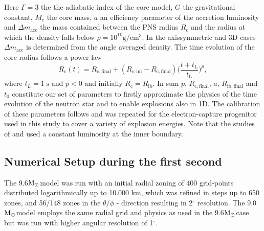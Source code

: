 \documentclass[fleqn,usenatbib]{mnras}
\newcommand{\solm}{\xspace\ensuremath{\rm{M_{\odot}}}}
\begin{document}
Here $\Gamma = 3$ the the adiabatic index of the core model, $G$ the gravitational constant, $M_{\mathrm{c}}$ the core mass, $a$ an efficiency parameter of the accretion luminosity and $\Delta m_{\mathrm{acc}}$ the mass contained between the PNS radius $R_\mathrm{c}$ and the radius at which the density falls below $\rho=10^{10}\mathrm{g/cm^3}$. 
In the axissymmetric and 3D cases $\Delta m_{\mathrm{acc}}$ is determined from the angle averaged density.
The time evolution of the core radius follows a power-law 
\begin{equation}
	R_{\mathrm{c}}(t) =R_{\mathrm{c,final}} + (R_{\mathrm{c,ini}} - R_{\mathrm{c,final}}) \Big( \frac{t+t_{\mathrm{L}}} {t_{\mathrm{L}}}  \Big)^p,
\end{equation}
where $t_L = 1 \; \mathrm{s}$ and $p < 0$ and  initially $R_{\mathrm{c}} = R_{\mathrm{ib}}$.
In sum $p$, $R_{\mathrm{c,final}}$, $a$, $R_{\mathrm{ib,final}}$ and $t_0$ constitute our set of parameters to firstly approximate the physics of the time evolution of the neutron star and to enable explosions also in 1D.
The calibration of these parameters follows \cite{Ertla} and was repeated for the electron-capture progenitor used in this study to cover a variety of explosion energies.
Note that the studies of \cite{Wongwathanarat2015} and \cite{Gessner2018} used a constant luminosity at the inner boundary. 

\subsection{Numerical Setup during the first second}

The 9.6\solm model was run with an initial radial zoning of 400 grid-points distributed logarithmically up to 10.000 km, which was refined in steps up to 650 zones, and 56/148 zones in the $\theta/\phi$ - direction resulting in 2$^\circ$ resolution.
The 9.0\solm model employs the same radial grid and physics as used in the 9.6\solm case but was run with higher angular resolution of 1$^\circ$.
\end{document}
